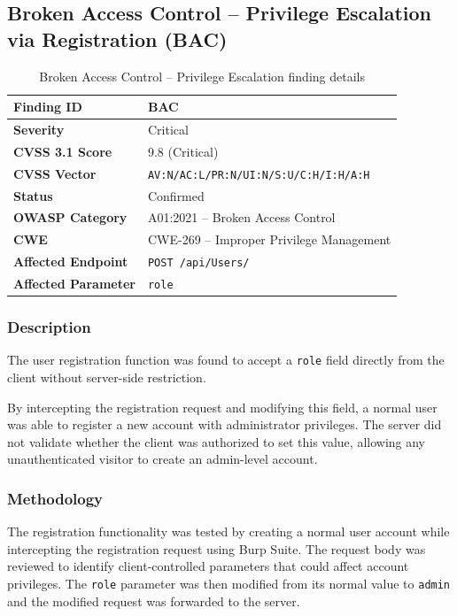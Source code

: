 \subsection*{Broken Access Control -- Privilege Escalation via Registration (BAC)}

\begin{table}[H]
\centering
\begin{tabular}{|l|p{10cm}|}
\hline
\textbf{Finding ID} & BAC \\
\hline
\textbf{Severity} & Critical \\
\hline
\textbf{CVSS 3.1 Score} & 9.8 (Critical) \\
\hline
\textbf{CVSS Vector} & \texttt{AV:N/AC:L/PR:N/UI:N/S:U/C:H/I:H/A:H} \\
\hline
\textbf{Status} & Confirmed \\
\hline
\textbf{OWASP Category} & A01:2021 -- Broken Access Control \\
\hline
\textbf{CWE} & CWE-269 -- Improper Privilege Management \\
\hline
\textbf{Affected Endpoint} & \texttt{POST /api/Users/} \\
\hline
\textbf{Affected Parameter} & \texttt{role} \\
\hline
\end{tabular}
\caption{Broken Access Control -- Privilege Escalation finding details}
\end{table}

\subsubsection*{Description}

The user registration function was found to accept a \texttt{role}
field directly from the client without server-side restriction.

By intercepting the registration request and modifying this field, a
normal user was able to register a new account with administrator
privileges. The server did not validate whether the client was
authorized to set this value, allowing any unauthenticated visitor to
create an admin-level account.

\subsubsection*{Methodology}

The registration functionality was tested by creating a normal user
account while intercepting the registration request using Burp Suite.
The request body was reviewed to identify client-controlled parameters
that could affect account privileges. The \texttt{role} parameter was
then modified from its normal value to \texttt{admin} and the modified
request was forwarded to the server.

